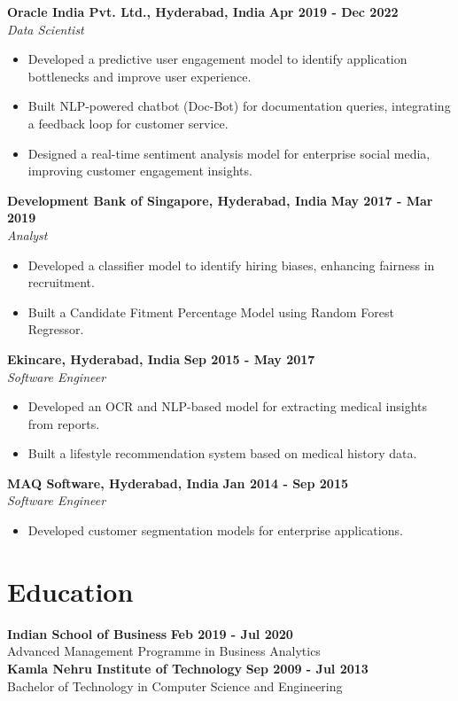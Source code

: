 \documentclass[a4paper,10pt]{article}
\begin{document}
\textbf{Oracle India Pvt. Ltd., Hyderabad, India} \hfill \textbf{Apr 2019 - Dec 2022}\\
\textit{Data Scientist}
\begin{itemize}
    \item Developed a predictive user engagement model to identify application bottlenecks and improve user experience.
    \item Built NLP-powered chatbot (Doc-Bot) for documentation queries, integrating a feedback loop for customer service.
    \item Designed a real-time sentiment analysis model for enterprise social media, improving customer engagement insights.
\end{itemize}

\textbf{Development Bank of Singapore, Hyderabad, India} \hfill \textbf{May 2017 - Mar 2019}\\
\textit{Analyst}
\begin{itemize}
    \item Developed a classifier model to identify hiring biases, enhancing fairness in recruitment.
    \item Built a Candidate Fitment Percentage Model using Random Forest Regressor.
\end{itemize}

\textbf{Ekincare, Hyderabad, India} \hfill \textbf{Sep 2015 - May 2017}\\
\textit{Software Engineer}
\begin{itemize}
    \item Developed an OCR and NLP-based model for extracting medical insights from reports.
    \item Built a lifestyle recommendation system based on medical history data.
\end{itemize}

\textbf{MAQ Software, Hyderabad, India} \hfill \textbf{Jan 2014 - Sep 2015}\\
\textit{Software Engineer}
\begin{itemize}
    \item Developed customer segmentation models for enterprise applications.
\end{itemize}

\section*{Education}
\textbf{Indian School of Business} \hfill \textbf{Feb 2019 - Jul 2020}\\
Advanced Management Programme in Business Analytics\\
\textbf{Kamla Nehru Institute of Technology} \hfill \textbf{Sep 2009 - Jul 2013}\\
Bachelor of Technology in Computer Science and Engineering
\end{document}
